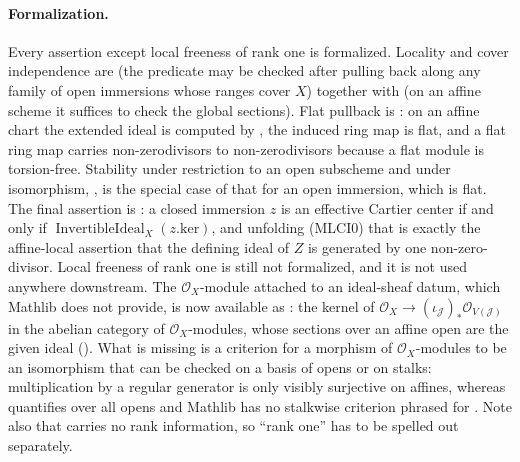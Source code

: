 \begin{lemma}
  \paragraph{Formalization.}
  Every assertion except local freeness of rank one is formalized.  Locality and cover
  independence are \texttt{} (the
  predicate may be checked after pulling back along any family of open immersions whose
  ranges cover $X$) together with \texttt{} (on an
  affine scheme it suffices to check the global sections).  Flat pullback is
  \texttt{}: on an affine chart the extended
  ideal is computed by \texttt{}, the
  induced ring map is flat, and a flat ring map carries non-zerodivisors to
  non-zerodivisors because a flat module is torsion-free.  Stability under restriction
  to an open subscheme and under isomorphism,
  \texttt{}, is the special case of
  that for an open immersion, which is flat.  The final assertion is
  \texttt{}: a closed
  immersion $z$ is an effective Cartier center if and only if
  $\operatorname{InvertibleIdeal}_X(z.\mathrm{ker})$, and unfolding (MLCI0) that is
  exactly the affine-local assertion that the defining ideal of $Z$ is generated by one
  non-zero-divisor.  Local freeness of rank one is still not formalized, and it is not
  used anywhere downstream.  The $\mathcal O_X$-module attached to an ideal-sheaf datum,
  which Mathlib does not provide, is now available as
  \texttt{}: the kernel of
  $\mathcal O_X\to(\iota_{\mathcal J})_*\mathcal O_{V(\mathcal J)}$ in the abelian
  category of $\mathcal O_X$-modules, whose sections over an affine open are the given
  ideal (\texttt{}).  What is missing is
  a criterion for a morphism of $\mathcal O_X$-modules to be an isomorphism that can be
  checked on a basis of opens or on stalks: multiplication by a regular generator is only
  visibly surjective on affines, whereas
  \texttt{} quantifies over all opens
  and Mathlib has no stalkwise criterion phrased for
  \texttt{}.  Note also that
  \texttt{} carries no rank information, so
  ``rank one'' has to be spelled out separately.
\end{lemma}

